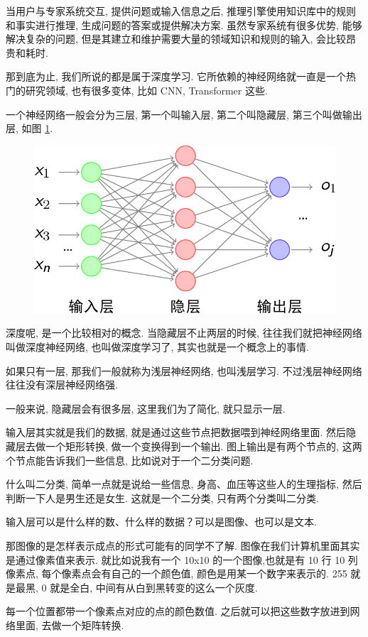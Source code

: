 当用户与专家系统交互, 提供问题或输入信息之后, 推理引擎使用知识库中的规则和事实进行推理, 生成问题的答案或提供解决方案. 虽然专家系统有很多优势, 能够解决复杂的问题, 但是其建立和维护需要大量的领域知识和规则的输入, 会比较昂贵和耗时. 

那到底为止, 我们所说的都是属于深度学习. 它所依赖的神经网络就一直是一个热门的研究领域, 也有很多变体, 比如 CNN, Transformer 这些. 

一个神经网络一般会分为三层, 第一个叫输入层, 第二个叫隐藏层, 第三个叫做输出层, 如图 \ref{fig:img17_1}. 

\begin{figure}[ht]
  \centering
  \includegraphics[width=0.5\linewidth]{asset/20230909101753.png}
  \caption{}
  \label{fig:img17_1}
\end{figure}

深度呢, 是一个比较相对的概念. 当隐藏层不止两层的时候, 往往我们就把神经网络叫做深度神经网络, 也叫做深度学习了, 其实也就是一个概念上的事情. 

如果只有一层, 那我们一般就称为浅层神经网络, 也叫浅层学习. 不过浅层神经网络往往没有深层神经网络强. 

一般来说, 隐藏层会有很多层, 这里我们为了简化, 就只显示一层. 

输入层其实就是我们的数据, 就是通过这些节点把数据喂到神经网络里面. 然后隐藏层去做一个矩形转换, 做一个变换得到一个输出. 图上输出是有两个节点的, 这两个节点能告诉我们一些信息, 比如说对于一个二分类问题. 

什么叫二分类, 简单一点就是说给一些信息, 身高、血压等这些人的生理指标, 然后判断一下人是男生还是女生. 这就是一个二分类, 只有两个分类叫二分类. 

输入层可以是什么样的数、什么样的数据？可以是图像、也可以是文本. 

那图像的是怎样表示成点的形式可能有的同学不了解. 图像在我们计算机里面其实是通过像素值来表示. 就比如说我有一个 10x10 的一个图像,也就是有 10 行 10 列像素点, 每个像素点会有自己的一个颜色值, 颜色是用某一个数字来表示的. 255 就是最黑, 0 就是全白, 中间有从白到黑转变的这么一个灰度. 

每一个位置都带一个像素点对应的点的颜色数值. 之后就可以把这些数字放进到网络里面, 去做一个矩阵转换. 

